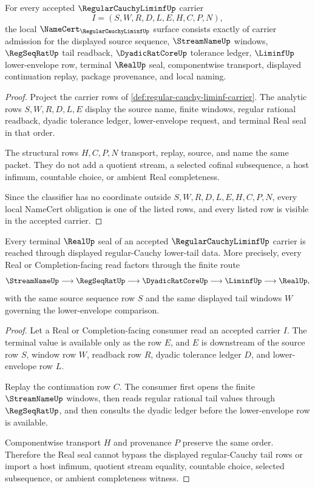 \begin{theorem}
\label{thm:regular-cauchy-liminf-namecert-obligations}
For every accepted $\RegularCauchyLiminfUp$ carrier
$$
I=(S,W,R,D,L,E,H,C,P,N),
$$
the local $\NameCert_{\RegularCauchyLiminfUp}$ surface consists exactly of carrier admission for the displayed source sequence, $\StreamNameUp$ windows, $\RegSeqRatUp$ tail readback, $\DyadicRatCoreUp$ tolerance ledger, $\LiminfUp$ lower-envelope row, terminal $\RealUp$ seal, componentwise transport, displayed continuation replay, package provenance, and local naming.
\end{theorem}
\begin{proof}
Project the carrier rows of \autoref{def:regular-cauchy-liminf-carrier}. The analytic rows $S,W,R,D,L,E$ display the source name, finite windows, regular rational readback, dyadic tolerance ledger, lower-envelope request, and terminal Real seal in that order.

The structural rows $H,C,P,N$ transport, replay, source, and name the same packet. They do not add a quotient stream, a selected cofinal subsequence, a host infimum, countable choice, or ambient Real completeness.

Since the classifier has no coordinate outside $S,W,R,D,L,E,H,C,P,N$, every local NameCert obligation is one of the listed rows, and every listed row is visible in the accepted carrier.
\end{proof}

\begin{theorem}
\label{thm:regular-cauchy-liminf-real-seal}
Every terminal $\RealUp$ seal of an accepted $\RegularCauchyLiminfUp$ carrier is reached through displayed regular-Cauchy lower-tail data. More precisely, every Real or Completion-facing read factors through the finite route
$$
\StreamNameUp \longrightarrow \RegSeqRatUp \longrightarrow \DyadicRatCoreUp \longrightarrow \LiminfUp \longrightarrow \RealUp ,
$$
with the same source sequence row $S$ and the same displayed tail windows $W$ governing the lower-envelope comparison.
\end{theorem}
\begin{proof}
Let a Real or Completion-facing consumer read an accepted carrier $I$. The terminal value is available only as the row $E$, and $E$ is downstream of the source row $S$, window row $W$, readback row $R$, dyadic tolerance ledger $D$, and lower-envelope row $L$.

Replay the continuation row $C$. The consumer first opens the finite $\StreamNameUp$ windows, then reads regular rational tail values through $\RegSeqRatUp$, and then consults the dyadic ledger before the lower-envelope row is available.

Componentwise transport $H$ and provenance $P$ preserve the same order. Therefore the Real seal cannot bypass the displayed regular-Cauchy tail rows or import a host infimum, quotient stream equality, countable choice, selected subsequence, or ambient completeness witness.
\end{proof}

